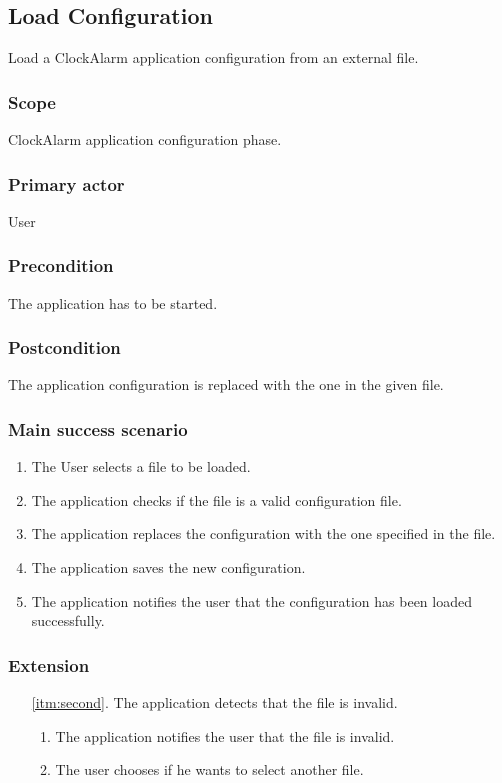 \subsection{Load Configuration}
Load a ClockAlarm application configuration from an external file.
\subsubsection{Scope}
ClockAlarm application configuration phase.
\subsubsection{Primary actor}
User
\subsubsection{Precondition}
The application has to be started.
\subsubsection{Postcondition}
The application configuration is replaced with the one in the given file.
\subsubsection{Main success scenario}
\begin{enumerate}
	\item The User selects a file to be loaded.
	\item \label{itm:second} The application checks if the file is a valid configuration file.
	\item The application replaces the configuration with the one specified in the file.
	\item The application saves the new configuration.
	\item The application notifies the user that the configuration has been loaded successfully.
\end{enumerate}
\subsubsection{Extension}
\begin{enumerate}
	\item[\ref{itm:second}.] The application detects that the file is invalid.
		\begin{enumerate}[i]
			\item The application notifies the user that the file is invalid.
			\item The user chooses if he wants to select another file.
		\end{enumerate}
\end{enumerate}